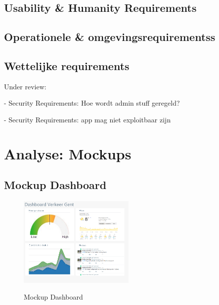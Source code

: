 \documentclass[a4paper]{article}
\begin{document}
\subsection{Usability \& Humanity Requirements}

\subsection{Operationele \& omgevingsrequirementss}

\subsection{Wettelijke requirements}


Under review:


- Security Requirements: Hoe wordt admin stuff geregeld?

- Security Requirements: app mag niet exploitbaar zijn



\newpage
\section{Analyse: Mockups}

\subsection{Mockup Dashboard}
\begin{figure}[H]
\centering
\includegraphics[width=0.5\textwidth]{Images/mockupdashboard.png}\\
\caption{Mockup Dashboard}
\end{figure}
\end{document}
